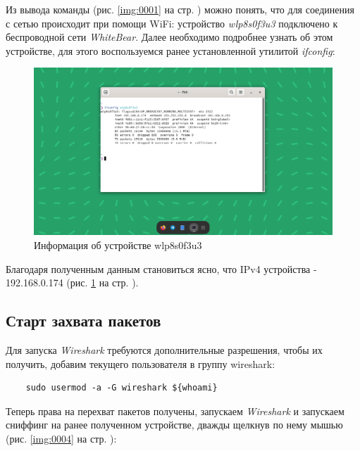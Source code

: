 \documentclass[a4paper]{article}
\begin{document}
  Из вывода команды (рис. \ref{img:0001} на стр. \pageref{img:0001}) можно понять, что для соединения с сетью происходит при помощи WiFi:
  устройство \textit{wlp8s0f3u3} подключено к беспроводной сети \textit{WhiteBear}.
  Далее необходимо подробнее узнать об этом устройстве,
  для этого воспользуемся ранее установленной утилитой \textit{ifconfig}:

  \begin{figure}[H]
    \centering
    \includegraphics[width=1.0\textwidth]{01_0002}
    \caption{Информация об устройстве wlp8s0f3u3}
    \label{img:0002}
  \end{figure}

  Благодаря полученным данным становиться ясно, что IPv4 устройства - 192.168.0.174 (рис. \ref{img:0002} на стр. \pageref{img:0002}).

  \subsection{Старт захвата пакетов}

  Для запуска \textit{Wireshark} требуются дополнительные разрешения, чтобы их получить, добавим
  текущего пользователя в группу wireshark:

  \begin{verbatim}
    sudo usermod -a -G wireshark ${whoami}
  \end{verbatim}  

  Теперь права на перехват пакетов получены, запускаем \textit{Wireshark} и запускаем сниффинг
  на ранее полученном устройстве, дважды щелкнув по нему мышью (рис. \ref{img:0004} на стр. \pageref{img:0004}):
\end{document}
